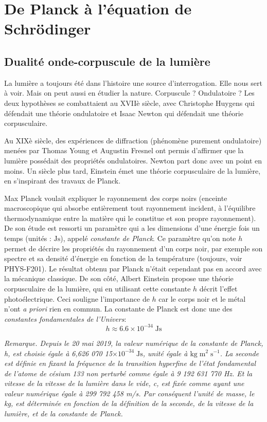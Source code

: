 \documentclass{book}
\begin{document}
\chapter{De Planck à l'équation de Schrödinger}\label{chap:chap2}

\section{Dualité onde-corpuscule de la lumière}
La lumière a toujours été dans l'histoire une source d'interrogation. Elle nous sert à voir. Mais on peut aussi en étudier la nature. Corpuscule ? Ondulatoire ? Les deux hypothèses se combattaient au XVIIè siècle, avec Christophe Huygens qui défendait une théorie ondulatoire et Isaac Newton qui défendait une théorie corpusculaire. 

Au XIXè siècle, des expériences de diffraction (phénomène purement ondulatoire) menées par Thomas Young et Augustin Fresnel ont permis d'affirmer que la lumière possédait des propriétés ondulatoires. Newton part donc avec un point en moins. Un siècle plus tard, Einstein émet une théorie corpusculaire de la lumière, en s'inspirant des travaux de Planck. 

Max Planck voulait expliquer le rayonnement des corps noirs (enceinte macroscopique qui absorbe entièrement tout rayonnement incident, à l'équilibre thermodynamique entre la matière qui le constitue et son propre rayonnement). De son étude est ressorti un paramètre qui a les dimensions d'une énergie fois un temps (unités : $\mathrm{Js}$), appelé \textit{constante de Planck}. Ce paramètre qu'on note $h$ permet de décrire les propriétés du   rayonnement d'un corps noir, par exemple son spectre et sa densité d'énergie en fonction de la température (toujours, voir PHYS-F201). Le résultat obtenu par Planck n'était cependant pas en accord avec la mécanique classique. De son côté, Albert Einstein propose une théorie corpusculaire de la lumière, qui  en utilisant cette  constante $h$ décrit l'effet photoélectrique.
Ceci souligne l'importance de $h$ car le corps noir et le métal n'ont \textit{a priori} rien en commun. La constante de Planck est donc une des \textit{constantes fondamentales de l'Univers}:
$$h \approx 6.6 \times 10^{-34} \; \mathrm{Js}$$

{\it Remarque. Depuis le 20 mai 2019,  la 
valeur numérique de la constante de Planck, h, 
est choisie égale à 
6,626 070 15$ \times 10^{-34}\; \mathrm{Js}$, 
unité égale à $\mathrm{kg\; m^2\; s^{-1}}$. 
La seconde est définie en fixant la fréquence de la transition hyperfine de l’état fondamental de l’atome de césium 133 non perturbé comme égale à 9 192 631 770 Hz. 
Et la vitesse de  la vitesse de la lumière dans le vide, c, est fixée comme ayant une valeur numérique égale à 299 792 458 m/s. 
Par conséquent l'unité de masse, le kg, est déterminée en fonction de la définition de la seconde, de la vitesse de la lumière, et de la constante de Planck.}
\end{document}
